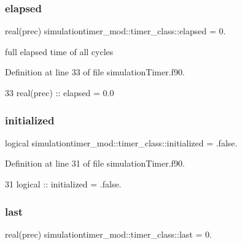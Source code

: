 \subsubsection{\texorpdfstring{elapsed}{elapsed}}
{\footnotesize\ttfamily real(prec) simulationtimer\+\_\+mod\+::timer\+\_\+class\+::elapsed = 0.\hspace{0.3cm}{\ttfamily [private]}}



full elapsed time of all cycles 



Definition at line 33 of file simulation\+Timer.\+f90.


\begin{DoxyCode}
33         \textcolor{keywordtype}{real(prec)} :: elapsed = 0.0
\end{DoxyCode}
\mbox{\label{structsimulationtimer__mod_1_1timer__class_a9252b5815eda23bfb60fda8d24265455}} 
\subsubsection{\texorpdfstring{initialized}{initialized}}
{\footnotesize\ttfamily logical simulationtimer\+\_\+mod\+::timer\+\_\+class\+::initialized = .false.\hspace{0.3cm}{\ttfamily [private]}}



Definition at line 31 of file simulation\+Timer.\+f90.


\begin{DoxyCode}
31         \textcolor{keywordtype}{logical} :: initialized = .false.
\end{DoxyCode}
\mbox{\label{structsimulationtimer__mod_1_1timer__class_a6dadb87043528a52de8e2571400a84e5}} 
\subsubsection{\texorpdfstring{last}{last}}
{\footnotesize\ttfamily real(prec) simulationtimer\+\_\+mod\+::timer\+\_\+class\+::last = 0.\hspace{0.3cm}{\ttfamily [private]}}



